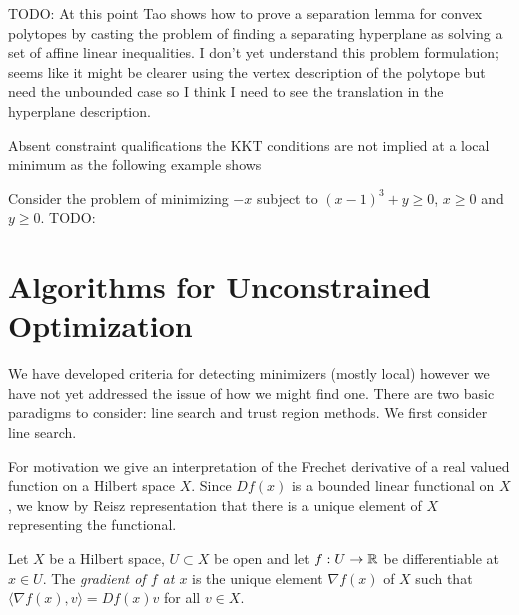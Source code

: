 TODO: At this point Tao shows how to prove a separation lemma for convex polytopes by casting the problem of finding a separating hyperplane as solving a set of affine linear inequalities.  
I don't yet understand this problem formulation; seems like it might be clearer using the vertex description of the polytope but need the unbounded case so I think I need to see the translation
in the hyperplane description.

Absent constraint qualifications the KKT conditions are not implied at a local minimum as the following example shows
\begin{examp}Consider the problem of minimizing $-x$ subject to $(x-1)^3 + y \geq 0$, $x \geq 0$ and $y \geq 0$.
TODO:
\end{examp}

\section{Algorithms for Unconstrained Optimization}

We have developed criteria for detecting minimizers (mostly local)
however we have not yet addressed the issue of how we might find one.
There are two basic paradigms to consider: line search and trust
region methods.  We first consider line search.

For motivation we give an interpretation of the Frechet derivative of
a real valued function on a Hilbert space $X$.  Since $Df(x)$ is a
bounded linear functional on $X$, we know by Reisz
representation that there is a unique element of $X$ representing the
functional.

\begin{defn}Let $X$ be a Hilbert space, $U \subset X$ be open and let
  $f : U \to \mathbb{R}$ be differentiable at $x \in U$.  The
  \emph{gradient of $f$ at $x$} is the unique element $\nabla f(x)$ of
  $X$ such that $\langle \nabla f(x), v \rangle = Df(x) v$ for all $v
  \in X$.
\end{defn}

